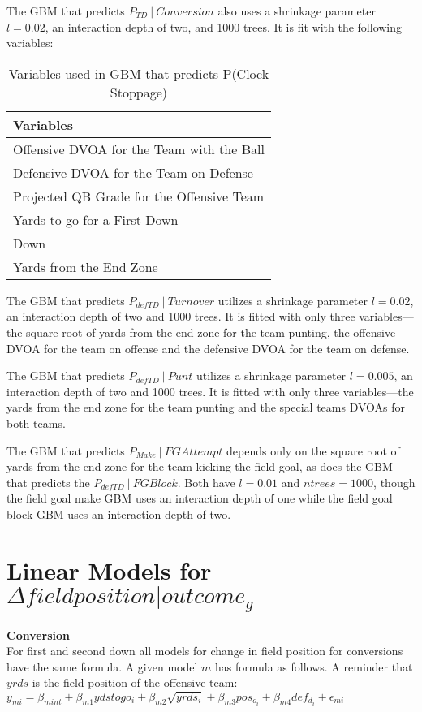 \documentclass[12pt,twoside]{dukestatscithesis}
\begin{document}
The GBM that predicts \(P_{TD}\:| \:Conversion\) also uses a shrinkage parameter \(l = 0.02\), an interaction depth of two, and 1000 trees. It is fit with the following variables:
\begin{longtable}[t]{l}
\caption{\label{tab:off-td-gbm}Variables used in GBM that predicts P(Clock Stoppage)}\\
\toprule
Variables\\
\midrule
Offensive DVOA for the Team with the Ball\\
Defensive DVOA for the Team on Defense\\
Projected QB Grade for the Offensive Team\\
Yards to go for a First Down\\
Down\\
Yards from the End Zone\\
\bottomrule
\end{longtable}
The GBM that predicts \(P_{defTD}\:|\:Turnover\) utilizes a shrinkage parameter \(l = 0.02\), an interaction depth of two and 1000 trees. It is fitted with only three variables---the square root of yards from the end zone for the team punting, the offensive DVOA for the team on offense and the defensive DVOA for the team on defense.

The GBM that predicts \(P_{defTD}\:|\:Punt\) utilizes a shrinkage parameter \(l = 0.005\), an interaction depth of two and 1000 trees. It is fitted with only three variables---the yards from the end zone for the team punting and the special teams DVOAs for both teams.

The GBM that predicts \(P_{Make}\:|\:FG Attempt\) depends only on the square root of yards from the end zone for the team kicking the field goal, as does the GBM that predicts the \(P_{defTD}\:|\:FG Block\). Both have \(l = 0.01\) and \(ntrees = 1000\), though the field goal make GBM uses an interaction depth of one while the field goal block GBM uses an interaction depth of two.

\hypertarget{linear-models-for-delta-field-position-outcome_g}{%
\section{\texorpdfstring{Linear Models for \(\Delta field position | outcome_{g}\)}{Linear Models for \textbackslash{}Delta field position \textbar{} outcome\_\{g\}}}\label{linear-models-for-delta-field-position-outcome_g}}

\textbf{Conversion}\\
For first and second down all models for change in field position for conversions have the same formula. A given model \(m\) has formula as follows. A reminder that \(yrds\) is the field position of the offensive team:
\(y_{mi} = \beta_{mint} + \beta_{m1}ydstogo_i + \beta_{m2}\sqrt{yrds_i} + \beta_{m3}pos_{o_i} + \beta_{m4}def_{d_i} + \epsilon_{mi}\)
\end{document}
